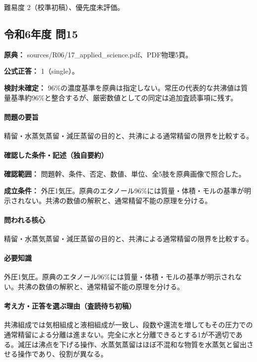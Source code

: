 \par 難易度 2（校準初稿）、優先度未評価。

\subsection{令和6年度 問15}
\label{q:r06-reg-applied-15}

\noindent\textbf{原典：} sources/R06/17\_applied\_science.pdf、PDF物理5頁。

\textbf{公式正答：} 1（single）。

\par\textbf{検討未確定：} 96\%の濃度基準を原典は指定しない。常圧の代表的な共沸値は質量基準約96\%と整合するが、厳密数値としての同定は追加査読事項に残す。

\paragraph{問題の要旨} 精留・水蒸気蒸留・減圧蒸留の目的と、共沸による通常精留の限界を比較する。

\paragraph{確認した条件・記述（独自要約）}\mbox{}\par

\noindent\textbf{確認範囲：} 問題幹、条件、否定、数値、単位、全5肢を原典画像で照合した。\par

\noindent\textbf{成立条件：} 外圧1気圧。原典のエタノール96\%には質量・体積・モルの基準が明示されない。共沸の数値の解釈と、通常精留不能の原理を分ける。\par

\paragraph{問われる核心} 精留・水蒸気蒸留・減圧蒸留の目的と、共沸による通常精留の限界を比較する。

\paragraph{必要知識} 外圧1気圧。原典のエタノール96\%には質量・体積・モルの基準が明示されない。共沸の数値の解釈と、通常精留不能の原理を分ける。

\paragraph{考え方・正答を選ぶ理由（査読待ち初稿）} 共沸組成では気相組成と液相組成が一致し、段数や還流を増してもその圧力での通常精留による分離は進まない。完全に水と分離できるとする1が不適切である。減圧は沸点を下げる操作、水蒸気蒸留はほぼ不混和な物質を水蒸気と留出させる操作であり、役割が異なる。


